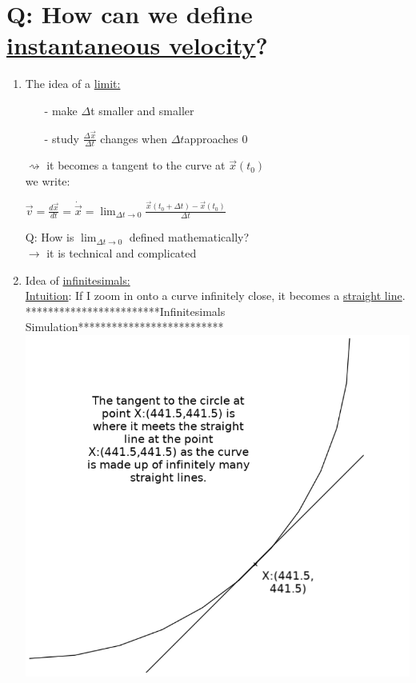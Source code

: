 \documentclass[a4paper, 12pt]{article}
\begin{document}
\section{Q: How can we define \underline{instantaneous velocity}?}
\begin{enumerate}
\item The idea of a \underline{limit:}
\begin{itemize}
\item[-] make $\Delta$t smaller and smaller
\item[-] study $\frac{\Delta\vec{x}}{\Delta t}$ changes when $\Delta t$approaches 0   \end{itemize}
$\rightsquigarrow$ it becomes a tangent to the curve at $\vec{x}(t_0)$\\
we write:
\begin{center}
$\vec{v} = \frac{d \vec{x}}{dt} = \dot{\vec{x}} = \displaystyle\lim_{\Delta t\to 0} \frac{\vec{x}(t_0+\Delta t) - \vec{x}(t_0)}{\Delta t}$\\
\end{center}
Q: How is $\displaystyle\lim_{\Delta t \to 0}$ defined mathematically?\\
$\rightarrow$ it is technical and complicated
\item Idea of \underline{infinitesimals:}\\
\underline{Intuition}: If I zoom in onto a curve infinitely close, it becomes a \underline{straight line}.\\
************************Infinitesimals Simulation**************************\\
\includegraphics[scale=0.65]{Infinitesimals Simulation}\\

\end{enumerate}
\end{document}
